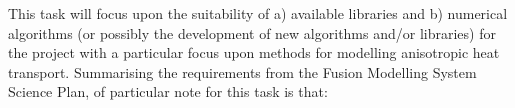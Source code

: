 
This task will focus upon the suitability of a) available libraries and 
b) numerical algorithms (or possibly the development of new algorithms and/or 
libraries) for the project with a particular focus upon methods for modelling 
anisotropic heat transport. %
Summarising the requirements from the Fusion Modelling System Science Plan, of 
particular note for this task is that:


